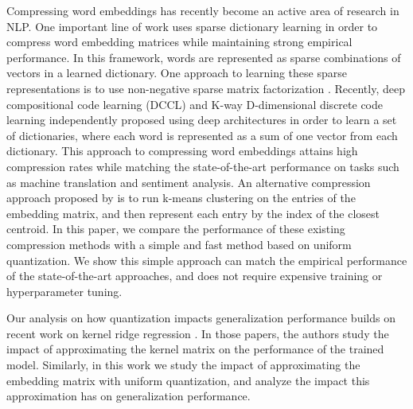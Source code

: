 Compressing word embeddings has recently become an active area of research in NLP.
One important line of work uses sparse dictionary learning in order to compress word embedding matrices while maintaining strong empirical performance.
In this framework, words are represented as sparse combinations of vectors in a learned dictionary.
One approach to learning these sparse representations is to use non-negative sparse matrix factorization \citep{murphy12,sparse16}.
Recently, deep compositional code learning (DCCL) \cite{dccl17} and K-way D-dimensional discrete code learning \cite{kway18} independently proposed using deep architectures in order to learn a set of dictionaries, where each word is represented as a sum of one vector from each dictionary.
This approach to compressing word embeddings attains high compression rates while matching the state-of-the-art performance on tasks such as machine translation and sentiment analysis.
An alternative compression approach proposed by \citet{andrews16} is to run k-means clustering on the entries of the embedding matrix, and then represent each entry by the index of the closest centroid.
In this paper, we compare the performance of these existing compression methods with a simple and fast method based on uniform quantization.
We show this simple approach can match the empirical performance of the state-of-the-art approaches, and does not require expensive training or hyperparameter tuning.

Our analysis on how quantization impacts generalization performance builds on recent work on kernel ridge regression \citep{avron17, lprff18}.
In those papers, the authors study the impact of approximating the kernel matrix on the performance of the trained model.
Similarly, in this work we study the impact of approximating the embedding matrix with uniform quantization, and analyze the impact this approximation has on generalization performance. 

